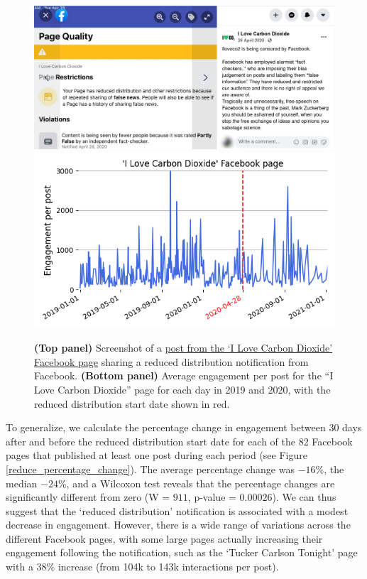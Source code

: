 \documentclass[11pt,a4paper]{article}
\begin{document}
\begin{figure}[!h]
\centering
\includegraphics[width=\linewidth]{./../figure/reduce_example_screenshot.png}
\includegraphics[width=\linewidth]{./../figure/reduce_example_timeseries.png}
\caption{{\bf(Top panel)} Screenshot of a \href{https://archive.is/ie4dR}{post from the `I Love Carbon Dioxide' Facebook page} sharing a reduced distribution notification from Facebook. {\bf(Bottom panel)} Average engagement per post for the “I Love Carbon Dioxide” page for each day in 2019 and 2020, with the reduced distribution start date shown in red.}
\label{reduce_example}
\end{figure}

To generalize, we calculate the percentage change in engagement between 30 days after and before the reduced distribution start date for each of the 82 Facebook pages that published at least one post during each period (see Figure \ref{reduce_percentage_change}).
The average percentage change was $-16\%$, the median $-24\%$, and a Wilcoxon test reveals that the percentage changes are significantly different from zero (W = $911$, p-value = $0.00026$).
We can thus suggest that the `reduced distribution' notification is associated with a modest decrease in engagement. 
However, there is a wide range of variations across the different Facebook pages, with some large pages actually increasing their engagement following the notification, such as the `Tucker Carlson Tonight' page with a $38\%$ increase (from 104k to 143k interactions per post).
\end{document}
